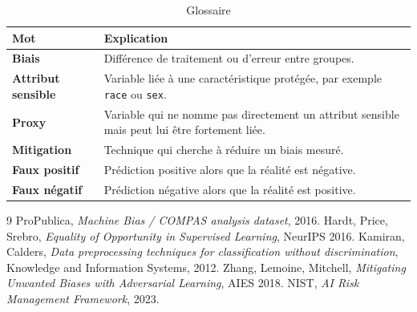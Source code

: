 \documentclass[12pt,a4paper]{report}
\begin{document}
\begin{table}[H]
\centering
\caption{Glossaire}
\begin{tabularx}{\textwidth}{>{\bfseries\color{primarydark}}l X}
\toprule
Mot & Explication \\
\midrule
Biais & Différence de traitement ou d'erreur entre groupes. \\
Attribut sensible & Variable liée à une caractéristique protégée, par exemple \texttt{race} ou \texttt{sex}. \\
Proxy & Variable qui ne nomme pas directement un attribut sensible mais peut lui être fortement liée. \\
Mitigation & Technique qui cherche à réduire un biais mesuré. \\
Faux positif & Prédiction positive alors que la réalité est négative. \\
Faux négatif & Prédiction négative alors que la réalité est positive. \\
\bottomrule
\end{tabularx}
\end{table}

\begin{thebibliography}{9}
 ProPublica, \emph{Machine Bias / COMPAS analysis dataset}, 2016.
 Hardt, Price, Srebro, \emph{Equality of Opportunity in Supervised Learning}, NeurIPS 2016.
 Kamiran, Calders, \emph{Data preprocessing techniques for classification without discrimination}, Knowledge and Information Systems, 2012.
 Zhang, Lemoine, Mitchell, \emph{Mitigating Unwanted Biases with Adversarial Learning}, AIES 2018.
 NIST, \emph{AI Risk Management Framework}, 2023.
\end{thebibliography}
\end{document}
